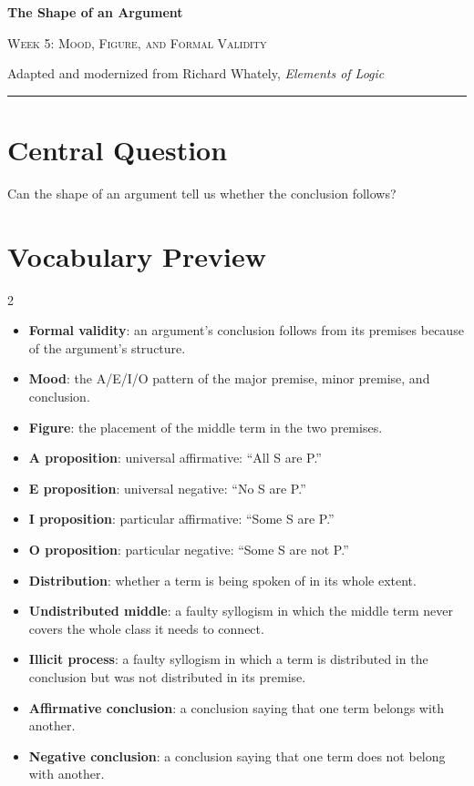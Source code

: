 \documentclass[12pt]{article}
\begin{document}
\begin{center}
{\LARGE\bfseries The Shape of an Argument}\par\vspace{0.25em}
{\large\scshape Week 5: Mood, Figure, and Formal Validity}\par\vspace{0.5em}
{Adapted and modernized from Richard Whately, \textit{Elements of Logic}}\par\vspace{0.6em}
\rule{0.82\textwidth}{0.4pt}
\end{center}

\section*{Central Question}
Can the shape of an argument tell us whether the conclusion follows?

\section*{Vocabulary Preview}
\begin{multicols}{2}
\begin{itemize}[leftmargin=*, itemsep=0.18em]
\item \textbf{Formal validity}: an argument's conclusion follows from its premises because of the argument's structure.
\item \textbf{Mood}: the A/E/I/O pattern of the major premise, minor premise, and conclusion.
\item \textbf{Figure}: the placement of the middle term in the two premises.
\item \textbf{A proposition}: universal affirmative: ``All S are P.''
\item \textbf{E proposition}: universal negative: ``No S are P.''
\item \textbf{I proposition}: particular affirmative: ``Some S are P.''
\item \textbf{O proposition}: particular negative: ``Some S are not P.''
\item \textbf{Distribution}: whether a term is being spoken of in its whole extent.
\item \textbf{Undistributed middle}: a faulty syllogism in which the middle term never covers the whole class it needs to connect.
\item \textbf{Illicit process}: a faulty syllogism in which a term is distributed in the conclusion but was not distributed in its premise.
\item \textbf{Affirmative conclusion}: a conclusion saying that one term belongs with another.
\item \textbf{Negative conclusion}: a conclusion saying that one term does not belong with another.
\end{itemize}
\end{multicols}
\end{document}
